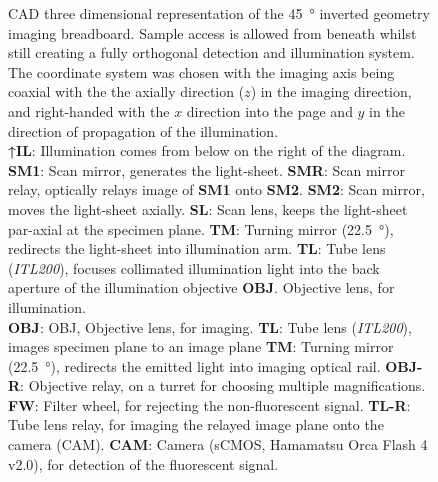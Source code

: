 \begin{figure}
        \ContinuedFloat
    \begin{fullpage}
    \caption{
    \gls{CAD} three dimensional representation of the \SI{45}{\degree} inverted geometry imaging breadboard.
    Sample access is allowed from beneath whilst still creating a fully orthogonal detection and illumination system.
    The coordinate system was chosen with the imaging axis being coaxial with the the axially direction (\(z\)) in the imaging direction, and right-handed with the \(x\) direction into the page and \(y\) in the direction of propagation of the illumination.\\
    \textcolor{illustrator_green}{\textbf{↑IL}}: Illumination comes from below on the right of the diagram.
    \textcolor{illustrator_green}{\textbf{SM1}}: Scan mirror, generates the \gls{light-sheet}.
    \textcolor{illustrator_green}{\textbf{SMR}}: Scan mirror relay, optically relays image of \textcolor{illustrator_green}{\textbf{SM1}} onto \textcolor{illustrator_green}{\textbf{SM2}}.
    \textcolor{illustrator_green}{\textbf{SM2}}: Scan mirror, moves the \gls{light-sheet} axially.
    \textcolor{illustrator_green}{\textbf{SL}}: Scan lens, keeps the \gls{light-sheet} par-axial at the specimen plane.
    \textcolor{illustrator_green}{\textbf{TM}}: Turning mirror (\SI{22.5}{\degree}), redirects the \gls{light-sheet} into \gls{illumination arm}.
    \textcolor{illustrator_green}{\textbf{TL}}: Tube lens (\emph{ITL200}), focuses collimated illumination light into the back aperture of the illumination objective \textcolor{illustrator_green}{\textbf{OBJ}}. Objective lens, for illumination.\\
    \textcolor{illustrator_red}{\textbf{OBJ}}: {OBJ}, Objective lens, for imaging.
    \textcolor{illustrator_red}{\textbf{TL}}: Tube lens (\emph{ITL200}), images specimen plane to an image plane
    \textcolor{illustrator_red}{\textbf{TM}}: Turning mirror (\SI{22.5}{\degree}), redirects the emitted light into \gls{imaging optical rail}.
    \textcolor{illustrator_red}{\textbf{OBJ-R}}: Objective relay, on a turret for choosing multiple magnifications.
    \textcolor{illustrator_red}{\textbf{FW}}: Filter wheel, for rejecting the non-fluorescent signal.
    \textcolor{illustrator_red}{\textbf{TL-R}}: Tube lens relay, for imaging the relayed image plane onto the camera (CAM).
    \textcolor{illustrator_red}{\textbf{CAM}}: Camera (sCMOS, Hamamatsu Orca Flash 4 v2.0), for detection of the fluorescent signal.
    }\label{fig:soldiworks_top}


\end{fullpage}
\end{figure}
